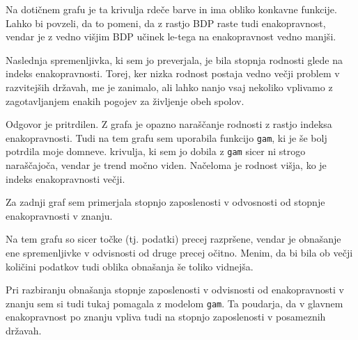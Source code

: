 \documentclass[11pt,a4paper]{article}
\begin{document}
Na dotičnem grafu je ta krivulja rdeče barve in ima obliko konkavne funkcije. Lahko bi povzeli, da to pomeni, da z rastjo BDP raste tudi enakopravnost, vendar je z vedno višjim BDP učinek le-tega na enakopravnost vedno manjši.

Naslednja spremenljivka, ki sem jo preverjala, je bila stopnja rodnosti glede na indeks enakopravnosti. Torej, ker nizka rodnost postaja vedno večji problem v razvitejših državah, me je zanimalo, ali lahko nanjo vsaj nekoliko vplivamo z zagotavljanjem enakih pogojev za življenje obeh spolov.



Odgovor je pritrdilen. Z grafa je opazno naraščanje rodnosti z rastjo indeksa enakopravnosti. Tudi na tem grafu sem uporabila funkcijo \verb-gam-, ki je še bolj potrdila moje domneve. krivulja, ki sem jo dobila z \verb-gam- sicer ni strogo naraščajoča, vendar je trend močno viden. Načeloma je rodnost višja, ko je indeks enakopravnosti večji.

Za zadnji graf sem primerjala stopnjo zaposlenosti v odvosnosti od stopnje enakopravnosti v znanju. 



Na tem grafu so sicer točke (tj. podatki) precej razpršene, vendar je obnašanje ene spremenljivke v odvisnosti od druge precej očitno. Menim, da bi bila ob večji količini podatkov tudi oblika obnašanja še toliko vidnejša. 

Pri razbiranju obnašanja stopnje zaposlenosti v odvisnosti od enakopravnosti v znanju sem si tudi tukaj pomagala z modelom \verb-gam-. Ta poudarja, da v glavnem enakopravnost po znanju vpliva tudi na stopnjo zaposlenosti v posameznih državah.
\end{document}
